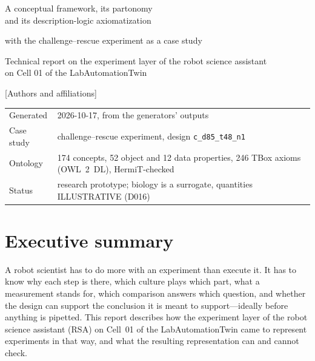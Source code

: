 \documentclass[10pt,a4paper]{article}
\begin{document}
\begin{titlepage}
\sffamily
\vspace*{2.2cm}
\noindent{\color{teal!55!black}\rule{\linewidth}{1.2pt}}\par\vspace{0.6cm}
\vspace{0.4cm}
{\Large A conceptual framework, its partonomy\\[2pt] and its description-logic axiomatization\par}\vspace{0.3cm}
{\large with the challenge--rescue experiment as a case study\par}\vspace{0.6cm}
\noindent{\color{teal!55!black}\rule{\linewidth}{1.2pt}}\par\vspace{1.0cm}
{\large Technical report on the experiment layer of the robot science assistant\\ on Cell 01 of the LabAutomationTwin\par}
\vspace{1.4cm}
{\normalsize [Authors and affiliations]\par}
\vfill
{\small\rmfamily
\begin{tabular}{@{}ll@{}}
Generated & 2026-10-17, from the generators' outputs \\
Case study & challenge--rescue experiment, design \texttt{c\_\allowbreak{}d85\_\allowbreak{}t48\_\allowbreak{}n1} \\
Ontology & 174 concepts, 52 object and 12 data properties, 246 TBox axioms (OWL~2~DL), HermiT-checked \\
Status & research prototype; biology is a surrogate, quantities ILLUSTRATIVE (D016) \\
\end{tabular}\par}
\end{titlepage}
\tableofcontents
\clearpage
{}

\section{Executive summary}\label{sec:summary}
A robot scientist has to do more with an experiment than execute it. It has to know why each step is there, which
culture plays which part, what a measurement stands for, which comparison answers which question, and whether the
design can support the conclusion it is meant to support---ideally before anything is pipetted. This report describes
how the experiment layer of the robot science assistant (RSA) on Cell~01 of the LabAutomationTwin came to represent
experiments in that way, and what the resulting representation can and cannot check.
\end{document}
